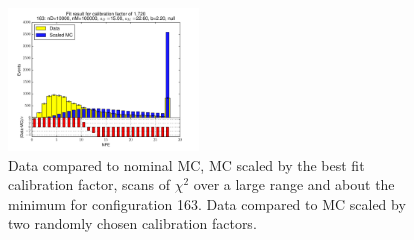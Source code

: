 \begin{figure}[htbp]
\begin{center}
\includegraphics[width=0.45\textwidth]{../FIGURES/163/FIG_Fit_result_for_calibration_factor_of_1_720.pdf} 
\caption{Data compared to nominal MC, MC scaled by the best fit calibration factor, scans of $\chi^2$ over a large range and about the minimum for configuration 163. Data compared to MC scaled by two randomly chosen calibration factors.} 
\label{tab:best_163} 
\end{center} \end{figure} 

